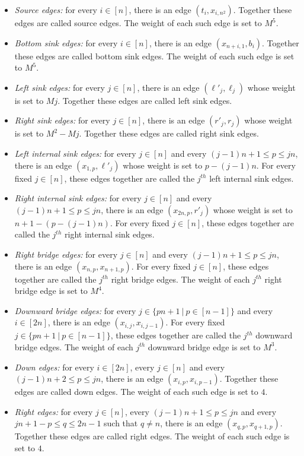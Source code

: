 \documentclass[a4paper,11pt]{article}
\theoremstyle{plain}
\newtheorem{identification rule}{Identification Rule}
\theoremstyle{definition}
\theoremstyle{remark}
\begin{document}
\begin{itemize}
\item \emph{Source edges:} for every $i \in [n]$, there is an edge $(t_i,x_{i,n^2})$. Together these edges are called source edges. The weight of each such edge is set to $M^5$.
\item \emph{Bottom sink edges:} for every $i \in [n]$, there is an edge $(x_{n+i,1},b_i)$. Together these edges are called bottom sink edges. The weight of each such edge is set to $M^5$.
\item \emph{Left sink edges:} for every $j \in [n]$, there is an edge $(\ell'_j,\ell_j)$ whose weight is set to $Mj$. Together these edges are called left sink edges.
\item  \emph{Right sink edges:} for every $j \in [n]$, there is an edge $(r'_j,r_j)$ whose weight is set to $M^2-Mj$. Together these edges are called right sink edges.
\item \emph{Left internal sink edges:} for every $j \in [n]$ and every $(j-1)n+1 \leq p \leq jn$, there is an edge $(x_{1,p},\ell'_j)$ whose weight is set to $p-(j-1)n$. For every fixed $j \in [n]$, these edges together are called the $j^{th}$ left internal sink edges.
\item \emph{Right internal sink edges:} for every $j \in [n]$ and every $(j-1)n + 1 \leq p \leq jn$, there is an edge $(x_{2n,p},r'_j)$ whose weight is set to $n+1-(p-(j-1)n)$. For every fixed $j \in [n]$, these edges together are called the $j^{th}$ right internal sink edges.
\item \emph{Right bridge edges:} for every $j \in [n]$ and every $(j-1)n + 1 \leq p \leq jn$, there is an edge $(x_{n,p},x_{n+1,p})$. For every fixed $j \in [n]$, these edges together are called the $j^{th}$ right bridge edges. The weight of each $j^{th}$ right bridge edge is set to $M^4$.
\item \emph{Downward bridge edges:} for every $j \in \{pn+1~|~p \in [n-1]\}$ and every $i \in [2n]$, there is an edge $(x_{i,j},x_{i,j-1})$. For every fixed $j \in \{pn+1~|~p \in [n-1]\}$, these edges together are called the $j^{th}$ downward bridge edges. The weight of each $j^{th}$ downward bridge edge is set to $M^3$.
\item \emph{Down edges:} for every $i \in [2n]$, every $j \in [n]$ and every $(j-1)n + 2 \leq p \leq jn$, there is an edge $(x_{i,p},x_{i,p-1})$. Together these edges are called down edges. The weight of each such edge is set to $4$.
\item \emph{Right edges:} for every $j \in [n]$, every $(j-1)n+1 \leq p \leq jn$ and every $ jn+1-p \leq q \leq 2n-1$ such that $q \neq n$, there is an edge $(x_{q,p},x_{q+1,p})$. Together these edges are called right edges. The weight of each such edge is set to $4$.

\end{itemize}
\end{document}
